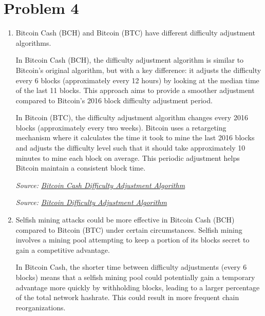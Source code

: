 \documentclass{article}
\begin{document}
\section*{Problem 4}
\begin{enumerate}
    \item Bitcoin Cash (BCH) and Bitcoin (BTC) have different difficulty adjustment algorithms.

In Bitcoin Cash (BCH), the difficulty adjustment algorithm is similar to Bitcoin's original algorithm, but with a key difference: it adjusts the difficulty every 6 blocks (approximately every 12 hours) by looking at the median time of the last 11 blocks. This approach aims to provide a smoother adjustment compared to Bitcoin's 2016 block difficulty adjustment period.

In Bitcoin (BTC), the difficulty adjustment algorithm changes every 2016 blocks (approximately every two weeks). Bitcoin uses a retargeting mechanism where it calculates the time it took to mine the last 2016 blocks and adjusts the difficulty level such that it should take approximately 10 minutes to mine each block on average. This periodic adjustment helps Bitcoin maintain a consistent block time.

\emph{Source: \href{https://github.com/bitcoincashorg/bitcoincash.org/blob/master/spec/nov-13-hardfork-spec.md#difficulty-adjustment-algorithm}{Bitcoin Cash Difficulty Adjustment Algorithm}}

\emph{Source: \href{https://en.bitcoin.it/wiki/Difficulty}{Bitcoin Difficulty Adjustment Algorithm}}

\item Selfish mining attacks could be more effective in Bitcoin Cash (BCH) compared to Bitcoin (BTC) under certain circumstances. Selfish mining involves a mining pool attempting to keep a portion of its blocks secret to gain a competitive advantage.

In Bitcoin Cash, the shorter time between difficulty adjustments (every 6 blocks) means that a selfish mining pool could potentially gain a temporary advantage more quickly by withholding blocks, leading to a larger percentage of the total network hashrate. This could result in more frequent chain reorganizations.


\end{enumerate}
\end{document}
